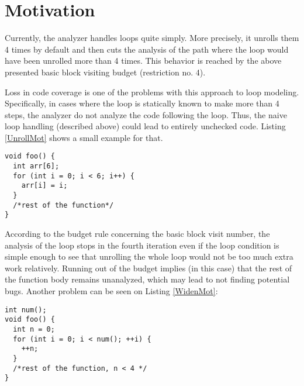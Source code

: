 
\section{Motivation}
Currently, the analyzer handles loops quite simply. More precisely, it unrolls 
them 4 times by default and then cuts the analysis of the path where the loop 
would have been unrolled more than 4 times. This behavior is reached by the 
above presented basic block visiting budget (restriction no. 4).

Loss in code coverage is one of the problems with this approach to loop
modeling. Specifically, in cases where the loop is statically known to make 
more than 4 steps, the analyzer do not analyze the code following the loop. 
Thus, the naive loop handling (described above) could lead to entirely 
unchecked code.
Listing \ref{UnrollMot} shows a small example for that.

\begin{lstlisting}
void foo() {
  int arr[6];
  for (int i = 0; i < 6; i++) {
    arr[i] = i;
  }
  /*rest of the function*/
}\end{lstlisting}

According to the budget rule concerning the basic block visit number, the
analysis of the loop stops in the fourth iteration even if the loop 
condition is simple enough to see that unrolling the whole loop would not be 
too much extra work relatively. Running out of the budget implies (in this 
case) that the rest of the function body remains unanalyzed, which may lead to 
not finding potential bugs.
Another problem can be seen on Listing \ref{WidenMot}:
\begin{lstlisting}
int num();
void foo() {
  int n = 0;
  for (int i = 0; i < num(); ++i) {
    ++n;
  }
  /*rest of the function, n < 4 */
}\end{lstlisting}

